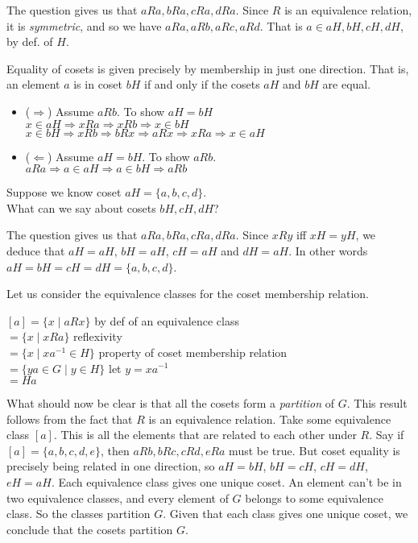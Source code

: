 
The question gives us that $aRa, bRa, cRa, dRa$. Since $R$ is an equivalence 
relation, it is \textit{symmetric}, and so we have $aRa, aRb, aRc, aRd$. 
That is $a \in aH,bH,cH,dH$, by def. of $H$. 

\frmrule

Equality of cosets is given precisely by membership in just one direction. 
That is, an element $a$ is in coset $bH$ if and only if 
the cosets $aH$ and $bH$ are equal. 

\begin{itemize}
\item ($\Rightarrow$) Assume $aRb$. To show $aH = bH$\\
$x \in aH \Rightarrow xRa \Rightarrow xRb \Rightarrow x \in bH$\\
$x \in bH \Rightarrow xRb \Rightarrow bRx \Rightarrow aRx \Rightarrow xRa \Rightarrow x \in aH$
\item ($\Leftarrow$) Assume $aH = bH$. To show $aRb$. \\
$aRa \Rightarrow a \in aH \Rightarrow a \in bH \Rightarrow aRb$
\end{itemize}

\frmrule

\begin{example}
Suppose we know coset $aH = \{a,b,c,d\}$. \\
What can we say about cosets $bH, cH, dH$?
\end{example}


The question gives us that $aRa, bRa, cRa, dRa$. 
Since $xRy$ iff $xH = yH$, we deduce that $aH = aH$, $bH = aH$, $cH = aH$ and $dH = aH$. 
In other words $aH = bH = cH = dH = \{a,b,c,d\}$. 

\frmrule

Let us consider the equivalence classes for the coset membership relation. 

$[a] = \{ x \;|\; aRx \}$ by def of an equivalence class \\
$ = \{ x \;|\; xRa \}$ reflexivity \\
$ = \{ x \;|\; xa^{-1} \in H \}$ property of coset membership relation \\
$ = \{ ya \in G \;|\; y \in H \}$  let $y = xa^{-1}$ \\
$ = Ha$ 

What should now be clear is that all the cosets form a \textit{partition} of $G$. 
This result follows from the fact that $R$ is an equivalence relation. 
Take some equivalence class $[a]$. This is all the elements that are related to 
each other under $R$. Say if $[a] = \{a,b,c,d,e\}$, then 
$aRb, bRc, cRd, eRa$ must be true. But coset equality is precisely being related 
in one direction, so $aH = bH$, $bH = cH$, $cH = dH$, $eH = aH$. 
Each equivalence class gives one unique coset. 
An element can't be in two equivalence classes, and 
every element of $G$ belongs to some equivalence class. 
So the classes partition $G$. 
Given that 
each class gives one unique coset,
we conclude that the cosets partition $G$. 

